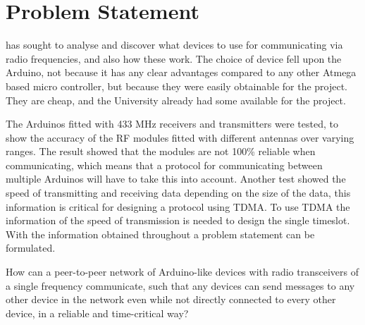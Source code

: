 \newpage
\chapter{Problem Statement}\label{sec:problemStatement}

 has sought to analyse and discover what devices to use for communicating via radio frequencies, and also how these work.
The choice of device fell upon the Arduino, not because it has any clear advantages compared to any other Atmega based micro controller, but because they were easily obtainable for the project.
They are cheap, and the University already had some available for the project.

The Arduinos fitted with 433 MHz receivers and transmitters were tested, to show the accuracy of the RF modules fitted with different antennas over varying ranges. 
The result showed that the modules are not 100\% reliable when communicating, which means that a protocol for communicating between multiple Arduinos will have to take this into account.
Another test showed the speed of transmitting and receiving data depending on the size of the data, this information is critical for designing a protocol using TDMA.
To use TDMA the information of the speed of transmission is needed to design the single timeslot. 
With the information obtained throughout  a problem statement can be formulated.

\bigskip

{\addtolength{\leftskip}{10mm}\addtolength{\rightskip}{10mm}\noindent\hrulefill\it

\noindent How can a peer-to-peer network of Arduino-like devices with radio transceivers of a single frequency communicate, such that any devices can send messages to any other device in the network even while not directly connected to every other device, in a reliable and time-critical way? 

\noindent\hrulefill

}

\bigskip








